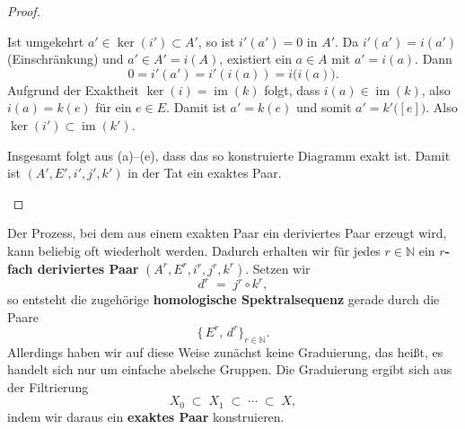 \documentclass[12pt]{article}
\numberwithin{conj}{section}
\newcommand{\ima}{\operatorname{im}}
\begin{document}
\begin{proof}
\begin{enumerate}[nolistsep]
              Ist umgekehrt $a' \in \ker(i') \subset A'$, so ist $i'(a') = 0$ in $A'$. Da $i'(a') = i(a')$ (Einschränkung) und $a' \in A' = i(A)$, existiert ein $a \in A$ mit $a' = i(a)$. Dann
              \[
                0 = i'(a') = i'(i(a)) = i\bigl(i(a)\bigr).
              \]
              Aufgrund der Exaktheit $\ker(i) = \ima(k)$ folgt, dass $i(a) \in \ima(k)$, also $i(a) = k(e)$ für ein $e \in E$. Damit ist $a' = k(e)$ und somit $a' = k'\bigl([e]\bigr)$. Also $\ker(i') \subset \ima(k')$. 
              
              Insgesamt folgt aus (a)--(e), dass das so konstruierte Diagramm exakt ist. Damit ist $(A', E', i', j', k')$ in der Tat ein exaktes Paar.
    \end{enumerate}
\end{proof}

Der Prozess, bei dem aus einem exakten Paar ein deriviertes Paar erzeugt wird, kann beliebig oft wiederholt werden. Dadurch erhalten wir für jedes $r \in \mathbb{N}$ ein \textbf{$r$-fach deriviertes Paar} $(A^r, E^r, i^r, j^r, k^r)$. Setzen wir
\[
    d^r \;=\; j^r \circ k^r,
\]
so entsteht die zugehörige \textbf{homologische Spektralsequenz} gerade durch die Paare
\[
    \{\,E^r,\, d^r\}_{r \in \mathbb{N}}.
\]
Allerdings haben wir auf diese Weise zunächst keine Graduierung, das heißt, es handelt sich nur um einfache abelsche Gruppen. Die Graduierung ergibt sich aus der Filtrierung
\[
    X_0 \;\subset\; X_1 \;\subset\; \cdots \;\subset\; X,
\]
indem wir daraus ein \textbf{exaktes Paar} konstruieren.
\end{document}
